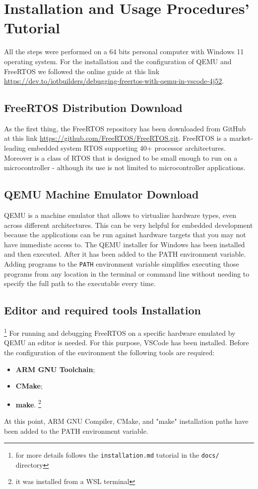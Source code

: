 \section{Installation and Usage Procedures' Tutorial}
\label{sec:Installation and Usage Procedures' Tutorial}
All the steps were performed on a 64 bits personal computer with Windows 11 operating system.
For the installation and the configuration of QEMU and FreeRTOS we followed the online guide at this link \url{https://dev.to/iotbuilders/debugging-freertos-with-qemu-in-vscode-4j52}. 
\subsection{FreeRTOS Distribution Download}
\label{subsec:FreeRTOS Distribution Download}
As the first thing, the FreeRTOS repository has been downloaded from GitHub at this link \url{https://github.com/FreeRTOS/FreeRTOS.git}.
FreeRTOS is a market-leading embedded system RTOS supporting 40+ processor architectures. Moreover is a class of RTOS that is designed to be small enough to run on a microcontroller - although its use is not limited to microcontroller applications.


\subsection{QEMU Machine Emulator Download}
\label{subsec:QEMU Machine Emulator Download}
QEMU is a machine emulator that allows to virtualize hardware types, even across different architectures. This can be very helpful for embedded development because the applications can be run against hardware targets that you may not have immediate access to.
\newline
The QEMU installer for Windows has been installed and then executed. After it has been added to the PATH environment variable. Adding programs to the \texttt{PATH} environment variable simplifies executing those programs from any location in the terminal or command line without needing to specify the full path to the executable every time.


\subsection{Editor and required tools Installation} 
\footnote{for more details follows the \texttt{installation.md} tutorial in the \texttt{docs/} directory}
For running and debugging FreeRTOS on a specific hardware emulated by QEMU an editor is needed. For this purpose, VSCode has been installed. 
Before the configuration of the environment the following tools are required:
\begin{itemize}
    \item \textbf{ARM GNU Toolchain};
    \item \textbf{CMake}; 
    \item \textbf{make}. \footnote{it was installed from a WSL terminal}
\end{itemize}
At this point, ARM GNU Compiler, CMake, and "make" installation paths have been added to the PATH environment variable. 

